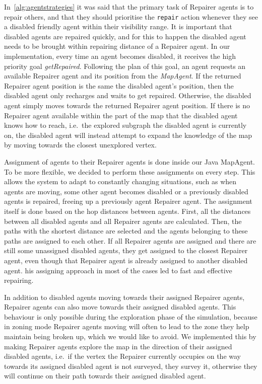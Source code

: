 In~\autoref{alg:agentstrategies} it was said that the primary task of Repairer agents is to repair others, and that they should prioritise the \texttt{repair} action whenever they see a disabled friendly agent within their visibility range.
It is important that disabled agents are repaired quickly, and for this to happen the disabled agent needs to be brought within repairing distance of a Repairer agent.
In our implementation, every time an agent becomes disabled, it receives the high priority goal \emph{getRepaired}.
Following the plan of this goal, an agent requests an available Repairer agent and its position from the \emph{MapAgent}.
If the returned Repairer agent position is the same the disabled agent's position, then the disabled agent only recharges and waits to get repaired.
Otherwise, the disabled agent simply moves towards the returned Repairer agent position.
If there is no Repairer agent available within the part of the map that the disabled agent knows how to reach, i.e.\ the explored subgraph the disabled agent is currently on, the disabled agent will instead attempt to expand the knowledge of the map by moving towards the closest unexplored vertex.

Assignment of agents to their Repairer agents is done inside our Java MapAgent.
To be more flexible, we decided to perform these assignments on every step.
This allows the system to adapt to constantly changing situations, such as when agents are moving, some other agent becomes disabled or a previously disabled agents is repaired, freeing up a previously agent Repairer agent.
The assignment itself is done based on the hop distances between agents.
First, all the distances between all disabled agents and all Repairer agents are calculated.
Then, the paths with the shortest distance are selected and the agents belonging to these paths are assigned to each other.
If all Repairer agents are assigned and there are still some unassigned disabled agents, they get assigned to the closest Repairer agent, even though that Repairer agent is already assigned to another disabled agent.
his assigning approach in most of the cases led to fast and effective repairing.

In addition to disabled agents moving towards their assigned Repairer agents, Repairer agents can also move towards their assigned disabled agents.
This behaviour is only possible during the exploration phase of the simulation, because in zoning mode Repairer agents moving will often to lead to the zone they help maintain being broken up, which we would like to avoid.
We implemented this by making Repairer agents explore the map in the direction of their assigned disabled agents, i.e.\ if the vertex the Repairer currently occupies on the way towards its assigned disabled agent is not surveyed, they survey it, otherwise they will continue on their path towards their assigned disabled agent.

